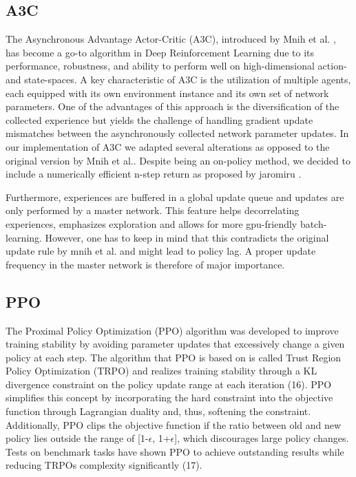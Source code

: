 \documentclass[letterpaper, 10 pt, conference]{ieeeconf}  %
\begin{document}
\subsection{A3C}
The Asynchronous Advantage Actor-Critic (A3C), introduced by Mnih et al. \cite{mnihAsynchronousMethodsDeep2016}, has become a go-to algorithm in 
Deep Reinforcement Learning due to its performance, robustness, and ability to perform well on high-dimensional action- and state-spaces. 
A key characteristic of A3C is the utilization of multiple agents, each equipped with its own environment instance and its own set of network parameters. 
One of the advantages of this approach is the diversification of the collected experience but yields the challenge of handling gradient update 
mismatches between the asynchronously collected network parameter updates. 
In our implementation of A3C we adapted several alterations as opposed to the original version by Mnih et al.. Despite being an on-policy method, we decided 
to include a numerically efficient n-step return as proposed by jaromiru \cite{janischLetMakeA3C}. %

Furthermore, experiences are buffered in a global update 
queue and updates are only performed by a master network. This feature helps decorrelating experiences, emphasizes exploration and allows for more gpu-friendly
batch-learning. However, one has to keep in mind that this contradicts the original update rule by mnih et al. and might lead to policy lag. A proper update 
frequency in the master network is therefore of major importance.

\subsection{PPO}

The Proximal Policy Optimization (PPO) algorithm was developed to improve training stability by avoiding parameter updates that excessively change a given policy at each step. The algorithm that PPO is based on is called Trust Region Policy Optimization (TRPO) and realizes training stability through a KL divergence constraint on the policy update range at each iteration (16). PPO simplifies this concept by incorporating the hard constraint into the objective function through Lagrangian duality and, thus, softening the constraint. Additionally, PPO clips the objective function if the ratio between old and new policy lies outside the range of [1-$\epsilon$, 1+$\epsilon$], which discourages large policy changes. Tests on benchmark tasks have shown PPO to achieve outstanding results while reducing TRPOs complexity significantly (17).
\end{document}
